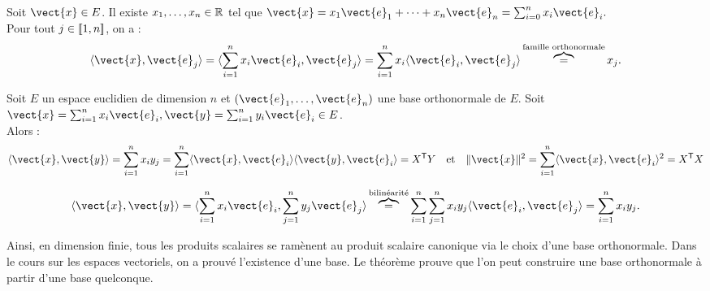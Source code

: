 \documentclass{book}
\begin{document}
\begin{Demonstration}
Soit $\vect{x}\in E$. Il existe $x_1,\dots,x_n\in\mathbb{R}$ tel que $\vect{x}= x_1 \vect{e}_1+\dots+x_n\vect{e}_n=\sum_{i=0}^n x_i\vect{e}_i.$\\
Pour tout $j\in \mathopen\lbrack\!\lbrack1,n \mathclose\rbrack\!\rbrack$, on a :
$$\PS{\vect{x}}{\vect{e}_j} = \PS{\sum_{i=1}^nx_i\vect{e}_i}{\vect{e}_j}=\sum_{i=1}^nx_i\PS{\vect{e}_i}{\vect{e}_j}\overbrace{=}^{\text{famille orthonormale}}x_j.$$ 
\end{Demonstration} 
\begin{Proposition}
Soit $E$ un espace euclidien de dimension $n$ et $(\vect{e}_1,\dots,\vect{e}_n)$ une base orthonormale de $E$.
Soit $\vect{x}= \sum_{i=1}^n x_i \vect{e}_i,\vect{y}=\sum_{i=1}^n y_i \vect{e}_i\in E$.\\
Alors :
$$\PS{\vect{x}}{\vect{y}}=\sum_{i=1}^n x_iy_j=\sum_{i=1}^n \PS{\vect{x}}{\vect{e}_i}\PS{\vect{y}}{\vect{e}_i}=   \transposee {X}Y\quad \text{et}\quad \norme{\vect{x}}^2=\sum_{i=1}^n \PS{\vect{x}}{\vect{e}_i}^2 =\transposee {X}X$$
\end{Proposition} 
\begin{Demonstration}
$$\PS{\vect{x}}{\vect{y}} = \PS{\sum_{i=1}^n x_i \vect{e}_i }{\sum_{j=1}^n y_j \vect{e}_j}\overbrace{=}^{\text{bilinéarité}}\sum_{i=1}^n\sum_{j=1}^n x_i y_j\PS{  \vect{e}_i }{ \vect{e}_j}=\sum_{i=1}^n x_iy_j. $$
\end{Demonstration}
Ainsi, en dimension finie, tous les produits scalaires se ramènent au produit scalaire canonique via le choix d'une base orthonormale. Dans le cours sur les espaces vectoriels, on a prouvé l'existence d'une base. Le théorème prouve que l'on peut construire une base orthonormale à partir d'une base quelconque.  
\end{document}
